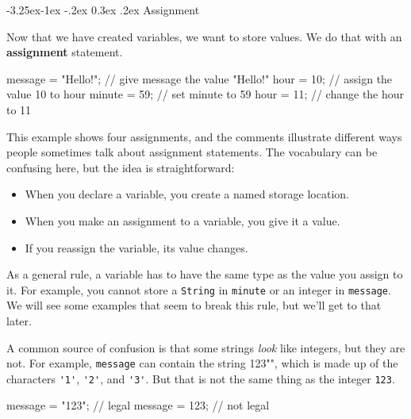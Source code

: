 \documentclass[12pt]{book}
\makeatletter
\theoremstyle{exercise}
\newcommand{\java}[1]{\verb"#1"}
\renewcommand\subsection{\@startsection{subsection}{2}{\z@}%
    {-3.25ex\@plus -1ex \@minus -.2ex}%
    {0.3ex \@plus .2ex}%
    {\normalfont\large\bfseries}}
\newcommand{\java}[1]{\lstinline{#1}} %
\makeatother
\begin{document}
\subsection{Assignment}


Now that we have created variables, we want to store values.
We do that with an {\bf assignment} statement.

\begin{code}
    message = "Hello!";  // give message the value "Hello!"
    hour = 10;           // assign the value 10 to hour
    minute = 59;         // set minute to 59
    hour = 11;           // change the hour to 11
\end{code}

This example shows four assignments, and the comments illustrate different ways people sometimes talk about assignment statements.
The vocabulary can be confusing here, but the idea is straightforward:

\begin{itemize}
\item When you declare a variable, you create a named storage location.
\item When you make an assignment to a variable, you give it a value.
\item If you reassign the variable, its value changes.
\end{itemize}

As a general rule, a variable has to have the same type as the value you assign to it.
For example, you cannot store a \java{String} in \java{minute} or an integer in \java{message}.
We will see some examples that seem to break this rule, but we'll get to that later.


A common source of confusion is that some strings {\em look} like integers, but they are not.
For example, \java{message} can contain the string \java{"123"}, which is made up of the characters \java{'1'}, \java{'2'}, and \java{'3'}.
But that is not the same thing as the integer \java{123}.

\begin{code}
    message = "123";  // legal
    message = 123;    // not legal
\end{code}
\end{document}
